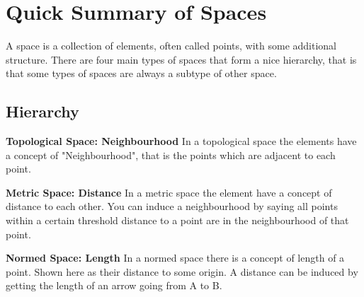 
\section{Quick Summary of Spaces}
A space is a collection of elements, often called points,
with some additional structure.
There are four main types of spaces that form a nice hierarchy,
that is that some types of spaces are always a subtype of other space.
\subsection{Hierarchy}
{\textbf{Topological Space: Neighbourhood}}
In a topological space the elements have a concept of "Neighbourhood",
that is the points which are adjacent to each point.
\begin{center}
\end{center}

{\textbf{Metric Space: Distance}}
In a metric space the element have a concept of distance to each other.
You can induce a neighbourhood by saying all points within a certain threshold distance to a point are in the neighbourhood of that point.
\begin{center}
\end{center}

{\textbf{Normed Space: Length}}
In a normed space there is a concept of length of a point.
Shown here as their distance to some origin.
A distance can be induced by getting the length of an arrow going from A to B.
\begin{center}
\end{center}


